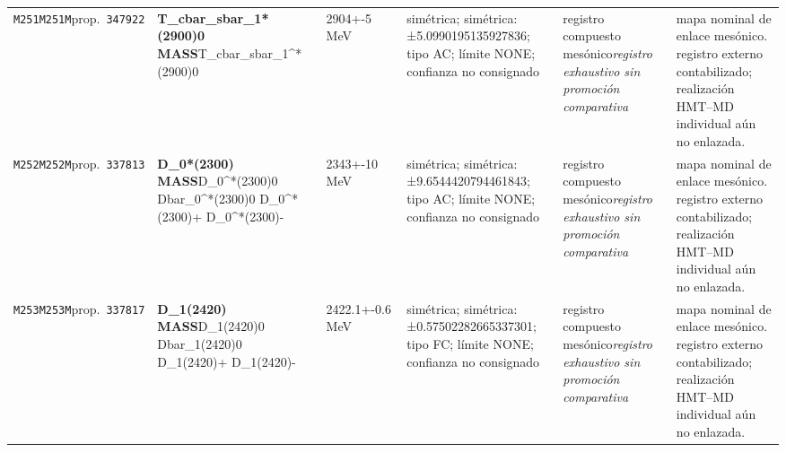 \begin{landscape}
\begin{longtable}{L{1.85cm}L{4.45cm}L{2.35cm}L{4.05cm}L{3.35cm}L{7.15cm}}
\texttt{M251}\newline \texttt{M251M}\newline prop.\ \texttt{347922} & \textbf{T\_\allowbreak{}cbar\_\allowbreak{}sbar\_\allowbreak{}1*(2900)0 MASS}\newline T\_\allowbreak{}cbar\_\allowbreak{}sbar\_\allowbreak{}1\textasciicircum{}*(2900)0 & 2904+-5\,MeV & simétrica; simétrica: ±5.0990195135927836; tipo AC; límite NONE; confianza no consignado & registro compuesto mesónico\newline \emph{registro exhaustivo sin promoción comparativa} & mapa nominal de enlace mesónico. registro externo contabilizado; realización HMT--MD individual aún no enlazada. \\
\texttt{M252}\newline \texttt{M252M}\newline prop.\ \texttt{337813} & \textbf{D\_\allowbreak{}0*(2300) MASS}\newline D\_\allowbreak{}0\textasciicircum{}*(2300)0 \textbar{}\allowbreak{} Dbar\_\allowbreak{}0\textasciicircum{}*(2300)0 \textbar{}\allowbreak{} D\_\allowbreak{}0\textasciicircum{}*(2300)+ \textbar{}\allowbreak{} D\_\allowbreak{}0\textasciicircum{}*(2300)- & 2343+-10\,MeV & simétrica; simétrica: ±9.6544420794461843; tipo AC; límite NONE; confianza no consignado & registro compuesto mesónico\newline \emph{registro exhaustivo sin promoción comparativa} & mapa nominal de enlace mesónico. registro externo contabilizado; realización HMT--MD individual aún no enlazada. \\
\texttt{M253}\newline \texttt{M253M}\newline prop.\ \texttt{337817} & \textbf{D\_\allowbreak{}1(2420) MASS}\newline D\_\allowbreak{}1(2420)0 \textbar{}\allowbreak{} Dbar\_\allowbreak{}1(2420)0 \textbar{}\allowbreak{} D\_\allowbreak{}1(2420)+ \textbar{}\allowbreak{} D\_\allowbreak{}1(2420)- & 2422.1+-0.6\,MeV & simétrica; simétrica: ±0.57502282665337301; tipo FC; límite NONE; confianza no consignado & registro compuesto mesónico\newline \emph{registro exhaustivo sin promoción comparativa} & mapa nominal de enlace mesónico. registro externo contabilizado; realización HMT--MD individual aún no enlazada. \\

\end{longtable}
\end{landscape}

